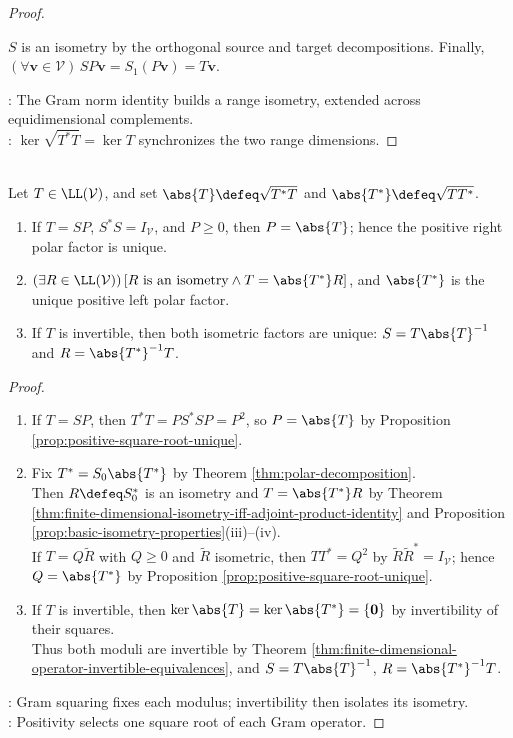 \begin{theorem}
\begin{proof}
\begin{enumerate}[label=(\roman*)]
$S$ is an isometry by the orthogonal source and target decompositions. Finally, $(\forall\mathbf{v}\in\mathcal{V})\,SP\mathbf{v}=S_1(P\mathbf{v})=T\mathbf{v}$.
\end{enumerate}
: The Gram norm identity builds a range isometry, extended across equidimensional complements.\\
: $\ker\sqrt{T^*T}=\ker T$ synchronizes the two range dimensions.
\end{proof}
\end{theorem}

\begin{corollary} \label{cor:operator-polar-decomposition-uniqueness} \\
Let $T\in\LL(\mathcal{V})$, and set $\abs{T}\defeq\sqrt{T^*T}$ and $\abs{T^*}\defeq\sqrt{TT^*}$.
\begin{enumerate}[label=(\roman*)]
\setlength{\itemsep}{0pt}
\item If $T=SP$, $S^*S=I_{\mathcal{V}}$, and $P\geq0$, then $P=\abs{T}$; hence the positive right polar factor is unique.
\item $(\exists R\in\LL(\mathcal{V}))\,[R\text{ is an isometry}\land T=\abs{T^*}R]$, and $\abs{T^*}$ is the unique positive left polar factor.
\item If $T$ is invertible, then both isometric factors are unique: $S=T\abs{T}^{-1}$ and $R=\abs{T^*}^{-1}T$.
\end{enumerate}
\begin{proof}
\begin{enumerate}[label=(\roman*)]
\setlength{\itemsep}{0pt}
\item If $T=SP$, then $T^*T=PS^*SP=P^2$, so $P=\abs{T}$ by Proposition \ref{prop:positive-square-root-unique}.
\item Fix $T^*=S_0\abs{T^*}$ by Theorem \ref{thm:polar-decomposition}.\\
Then $R\defeq S_0^*$ is an isometry and $T=\abs{T^*}R$ by Theorem \ref{thm:finite-dimensional-isometry-iff-adjoint-product-identity} and Proposition \ref{prop:basic-isometry-properties}(iii)--(iv).\\
If $T=Q\widetilde R$ with $Q\geq0$ and $\widetilde R$ isometric, then $TT^*=Q^2$ by $\widetilde R\widetilde R^*=I_{\mathcal{V}}$; hence $Q=\abs{T^*}$ by Proposition \ref{prop:positive-square-root-unique}.
\item If $T$ is invertible, then $\ker\abs{T}=\ker\abs{T^*}=\{\mathbf{0}\}$ by invertibility of their squares.\\
Thus both moduli are invertible by Theorem \ref{thm:finite-dimensional-operator-invertible-equivalences}, and $S=T\abs{T}^{-1}$, $R=\abs{T^*}^{-1}T$.
\end{enumerate}
: Gram squaring fixes each modulus; invertibility then isolates its isometry.\\
: Positivity selects one square root of each Gram operator.
\end{proof}
\end{corollary}

